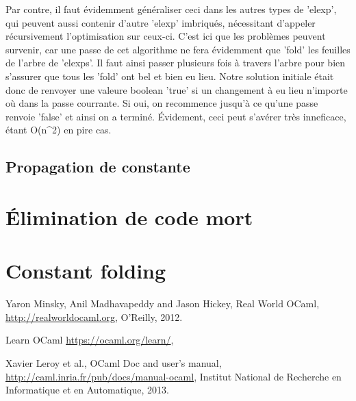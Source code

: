 \documentclass{article}
\begin{document}
Par contre, il faut évidemment généraliser ceci dans les autres types de 'elexp', qui peuvent aussi contenir d'autre 'elexp' imbriqués, nécessitant d'appeler récursivement l'optimisation sur ceux-ci. C'est ici que les problèmes peuvent survenir, car une passe de cet algorithme ne fera évidemment que 'fold' les feuilles de l'arbre de 'elexps'. Il faut ainsi passer plusieurs fois à travers l'arbre pour bien s'assurer que tous les 'fold' ont bel et bien eu lieu. Notre solution initiale était donc de renvoyer une valeure boolean 'true' si un changement à eu lieu n'importe où dans la passe courrante. Si oui, on recommence jusqu'à ce qu'une passe renvoie 'false' et ainsi on a terminé. Évidement, ceci peut s'avérer très inneficace, étant O(n^2) en pire cas.


\subsection{Propagation de constante}

\section{Élimination de code mort}




\section{Constant folding}
\begin{thebibliography}{9}

	Yaron Minsky, Anil Madhavapeddy and Jason Hickey,
	Real World OCaml,
	\url{http://realworldocaml.org},
	O'Reilly,
	2012.

	Learn OCaml
	\url{https://ocaml.org/learn/},

	Xavier Leroy et al.,
	OCaml Doc and user's manual,
	\url{http://caml.inria.fr/pub/docs/manual-ocaml},
	Institut National de Recherche en Informatique et en Automatique,
	2013.

\end{thebibliography}
\end{document}
